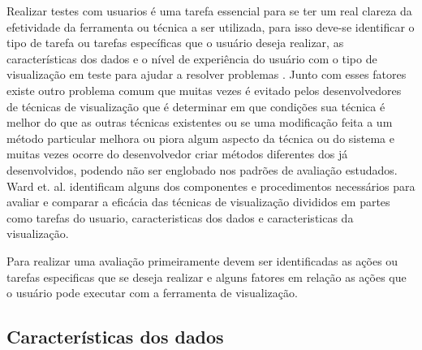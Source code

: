 Realizar testes com usuarios é uma tarefa essencial para se ter um  real clareza da efetividade da ferramenta ou técnica a ser utilizada, para isso deve-se identificar o tipo de tarefa ou tarefas específicas que o usuário deseja realizar, as características dos dados e o nível de experiência do usuário com o tipo de visualização em teste para ajudar a resolver problemas \cite{ward2015interactive}.
Junto com esses fatores existe outro problema \cite{ward2015interactive} comum que muitas vezes é evitado pelos desenvolvedores de técnicas de visualização que é determinar em que condições sua técnica é melhor do que as outras técnicas existentes ou se uma modificação feita a um método particular melhora ou piora algum aspecto da técnica ou do sistema e muitas vezes ocorre do desenvolvedor criar métodos diferentes dos já desenvolvidos, podendo não ser englobado nos padrões de avaliação estudados.
Ward et. al. \cite{ward2015interactive}  identificam alguns dos componentes e procedimentos necessários para avaliar e comparar a eficácia das técnicas de visualização divididos em partes como tarefas do usuario, caracteristicas dos dados e caracteristicas da visualização.

%
%

Para realizar uma avaliação primeiramente devem ser identificadas as ações ou tarefas especificas que se deseja realizar e alguns fatores em relação as ações que o usuário pode executar com a ferramenta de visualização.



\subsection{Características dos dados}

